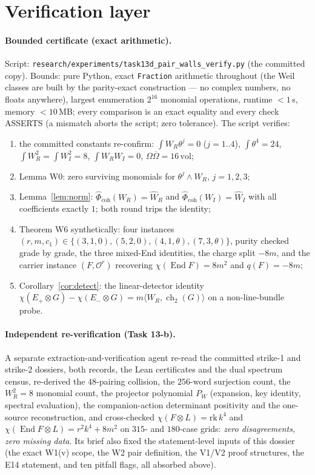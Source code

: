 \documentclass[11pt]{article}
\theoremstyle{definition}
\newcommand{\ch}{\operatorname{ch}}
\newcommand{\End}{\operatorname{End}}
\newcommand{\vol}{\mathrm{vol}}
\newcommand{\FMc}{\widehat\Phi}
\begin{document}
\section{Verification layer}\label{sec:cert}

\paragraph{Bounded certificate (exact arithmetic).}
Script: \texttt{research/experiments/task13d\_pair\_walls\_verify.py}
(the committed copy). Bounds: pure Python, exact \texttt{Fraction}
arithmetic throughout (the Weil classes are built by the parity-exact
construction --- no complex numbers, no floats anywhere), largest
enumeration $2^{16}$ monomial operations, runtime $<1$\,s, memory
$<10$\,MB; every comparison is an exact equality and every check ASSERTS
(a mismatch aborts the script; zero tolerance).
The script verifies:
\begin{enumerate}
\item the committed constants re-confirm: $\int W_R\theta^j=0$ ($j=1..4$),
$\int\theta^4=24$, $\int W_R^2=\int W_I^2=8$, $\int W_RW_I=0$,
$\Omega\overline\Omega=16\,\vol$;
\item Lemma W0: zero surviving monomials for $\theta^j\wedge W_R$,
$j=1,2,3$;
\item Lemma~\ref{lem:norm}: $\FMc_{\mathrm{coh}}(W_R)=\widehat W_R$ and
$\FMc_{\mathrm{coh}}(W_I)=\widehat W_I$ with all coefficients exactly $1$;
both round trips the identity;
\item Theorem W6 synthetically: four instances
$(r,m,c_1)\in\{(3,1,0),(5,2,0),(4,1,\theta),(7,3,\theta)\}$, purity checked
grade by grade, the three mixed-End identities, the charge split $-8m$,
and the carrier instance $(F,\mathcal O^r)$ recovering $\chi(\End F)=8m^2$
and $q(F)=-8m$;
\item Corollary~\ref{cor:detect}: the linear-detector identity
$\chi(E_+\otimes G)-\chi(E_-\otimes G)=m\langle W_R,\ch_2(G)\rangle$ on a
non-line-bundle probe.
\end{enumerate}

\paragraph{Independent re-verification (Task 13-b).}
A separate extraction-and-verification agent re-read the committed strike-1
and strike-2 dossiers, both records, the Lean certificates and the dual
spectrum census, re-derived the $48$-pairing collision, the $256$-word
surjection count, the $W_R^2=8$ monomial count, the projector polynomial
$P_W$ (expansion, key identity, spectral evaluation), the companion-action
determinant positivity and the one-source reconstruction, and cross-checked
$\chi(F\otimes L)=\mathrm{rk}\,k^4$ and
$\chi(\End F\otimes L)=r^2k^4+8m^2$ on $315$- and $180$-case grids:
\emph{zero disagreements, zero missing data}. Its brief also fixed the
statement-level inputs of this dossier (the exact W1(v) scope, the W2 pair
definition, the V1/V2 proof structures, the E14 statement, and ten
pitfall flags, all absorbed above).
\end{document}

